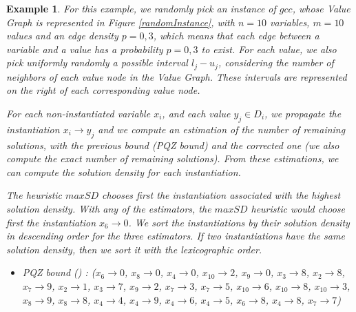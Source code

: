 \documentclass[jair,twoside,11pt,theapa]{article}
\newtheorem{example}[theorem]{Example}
\begin{document}
\begin{example}
	For this example, we randomly pick an instance of $gcc$, whose Value Graph is represented in Figure \ref{randomInstance}, with $n=10$ variables, $m=10$ values and an edge density $p=0,3$, which means that each edge between a variable and a value has a probability $p=0,3$ to exist. For each value, we also pick uniformly randomly a possible interval $l_j-u_j$, considering the number of neighbors of each value node in the Value Graph. These intervals are represented on the right of each corresponding value node.
    
    For each non-instantiated variable $x_i$, and each value $y_j \in D_i$, we propagate the instantiation $x_i \rightarrow y_j$ and we compute an estimation of the number of remaining solutions, with the previous bound (PQZ bound) and the corrected one (we also compute the exact number of remaining solutions). From these estimations, we can compute the solution density for each instantiation. %
    
    
     The heuristic $maxSD$ chooses first the instantiation associated with the highest solution density. With any of the estimators, the $maxSD$ heuristic would choose first the instantiation $x_6 \rightarrow 0$. We sort the instantiations by their solution density in descending order for the three estimators. If two instantiations have the same solution density, then we sort it with the lexicographic order.
    
    \begin{itemize}
    	\item[-] PQZ bound (\cite{PesantQZ12}) : 
        ($x_{6} \rightarrow 0$, $x_{8} \rightarrow 0$, $x_{4} \rightarrow 0$, $x_{10} \rightarrow 2$, $x_{9} \rightarrow 0$, $x_{3} \rightarrow 8$, $x_{2} \rightarrow 8$, $x_{7} \rightarrow 9$, $x_{2} \rightarrow 1$, $x_{3} \rightarrow 7$, $x_{9} \rightarrow 2$, $x_{7} \rightarrow 3$, $x_{7} \rightarrow 5$, $x_{10} \rightarrow 6$, $x_{10} \rightarrow 8$, $x_{10} \rightarrow 3$, $x_{8} \rightarrow 9$, $x_{8} \rightarrow 8$, $x_{4} \rightarrow 4$, $x_{4} \rightarrow 9$, $x_{4} \rightarrow 6$, $x_{4} \rightarrow 5$, $x_{6} \rightarrow 8$, $x_{4} \rightarrow 8$, $x_{7} \rightarrow 7$)
        

\end{itemize}
\end{example}
\end{document}
